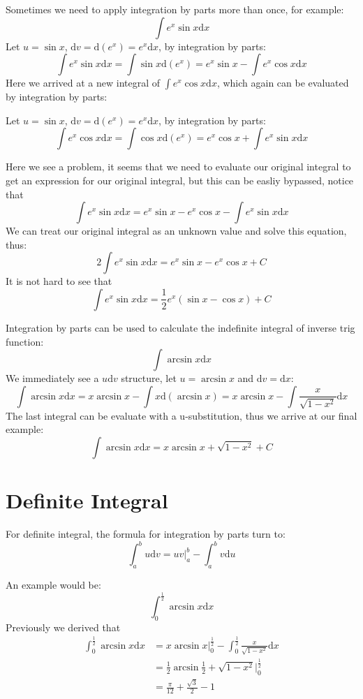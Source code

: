 \documentclass{article}
\numberwithin{equation}{section}
\begin{document}
\newpage
Sometimes we need to apply integration by parts more than once, for example:
\[
\int e^x \sin x \mathrm{d}x
\]
Let $u = \sin x$, $\mathrm{d}v = \mathrm{d}(e^x) = e^x \mathrm{d}x$, by integration by parts:
\[
\int e^x \sin x \mathrm{d}x = \int \sin x \mathrm{d}(e^x) = e^x \sin x - \int e^x \cos x \mathrm{d}x
\]
Here we arrived at a new integral of $\int e^x \cos x \mathrm{d}x$, which again can be evaluated by integration by parts:

Let $u = \sin x$, $\mathrm{d}v = \mathrm{d}(e^x) = e^x \mathrm{d}x$, by integration by parts:
\[
\int e^x \cos x \mathrm{d}x = \int \cos x \mathrm{d}(e^x) = e^x \cos x + \int e^x \sin x \mathrm{d}x
\]

Here we see a problem, it seems that we need to evaluate our original integral to get an expression for our original integral, but this can be easliy bypassed,
notice that
\[
\int e^x \sin x \mathrm{d}x = e^x \sin x - e^x \cos x - \int e^x \sin x \mathrm{d}x
\]
We can treat our original integral as an unknown value and solve this equation, thus:
\[
2 \int e^x \sin x \mathrm{d}x = e^x \sin x - e^x \cos x + C
\]
It is not hard to see that
\[
\int e^x \sin x \mathrm{d}x = \frac{1}{2}e^x (\sin x - \cos x) + C
\]

Integration by parts can be used to calculate the indefinite integral of inverse trig function:
\[
\int \arcsin x \mathrm{d}x
\]
We immediately see a $u\mathrm{d}v$ structure, let $u=\arcsin x$ and $\mathrm{d}v = \mathrm{d}x$:
\[
\int \arcsin x \mathrm{d}x = x\arcsin x - \int x \mathrm{d}(\arcsin x) = x\arcsin x - \int \frac{x}{\sqrt{1-x^2}} \mathrm{d}x
\]
The last integral can be evaluate with a u-substitution, thus we arrive at our final example:
\[
\int \arcsin x \mathrm{d}x = x\arcsin x + \sqrt{1-x^2} + C
\]

\newpage
\section{Definite Integral}
For definite integral, the formula for integration by parts turn to:
\[
\int_{a}^{b} u\mathrm{d}v = uv \Big|_a^b - \int_{a}^{b} v\mathrm{d}u
\]

An example would be:
\[
\int_{0}^{\frac{1}{2}} \arcsin x \mathrm{d}x
\]
Previously we derived that
\begin{align*}
    \int_{0}^{\frac{1}{2}} \arcsin x \mathrm{d}x &= x\arcsin x \Big|_0^{\frac{1}{2}}- \int_{0}^{\frac{1}{2}} \frac{x}{\sqrt{1-x^2}} \mathrm{d}x\\
    &= \frac{1}{2} \arcsin \frac{1}{2} + \sqrt{1-x^2} \Big|_{0}^{\frac{1}{2}}\\
    &= \frac{\pi}{12} + \frac{\sqrt{3}}{2} - 1
\end{align*}
\end{document}

